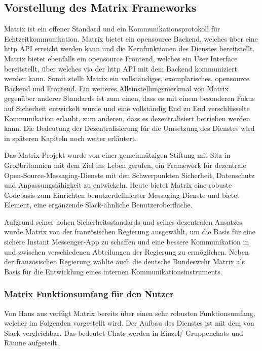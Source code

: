 \subsection{Vorstellung des Matrix Frameworks}\label{chapter:vdmf}
Matrix ist ein offener Standard und ein Kommunikationsprotokoll für  Echtzeitkommunikation. Matrix bietet ein opensource Backend, welches über eine http API erreicht werden kann und die Kernfunktionen des Dienstes bereitstellt. Matrix bietet ebenfalls ein opensource Frontend, welches ein User Interface bereitstellt, über welches via der http API mit dem Backend kommuniziert werden kann. Somit stellt Matrix ein vollständiges, exemplarisches, opensource Backend und Frontend. Ein weiteres Alleinstellungsmerkmal von Matrix gegenüber anderer Standards ist zum einen, dass es mit einem besonderen Fokus auf Sicherheit entwickelt wurde und eine vollständig End zu End verschlüsselte Kommunikation  erlaubt, zum anderen, dass es dezentralisiert betrieben werden kann. Die Bedeutung der Dezentralisierung für die Umsetzung des Dienstes wird in späteren Kapiteln noch weiter erläutert.

Das Matrix-Projekt wurde von einer gemeinnützigen Stiftung mit Sitz in Großbritannien mit dem Ziel ins Leben gerufen, ein Framework für dezentrale Open-Source-Messaging-Dienste mit den Schwerpunkten Sicherheit, Datenschutz und Anpassungsfähigkeit zu entwickeln. Heute bietet Matrix eine robuste Codebasis zum Einrichten benutzerdefinierter Messaging-Dienste und bietet Element, eine ergänzende Slack-ähnliche Benutzeroberfläche.

Aufgrund seiner hohen Sicherheitsstandards und seines dezentralen Ansatzes wurde Matrix  von der französischen Regierung ausgewählt, um die Basis für eine sichere Instant Messenger-App zu schaffen und eine bessere Kommunikation in und zwischen verschiedenen Abteilungen der Regierung zu ermöglichen. Neben der französischen Regierung wählte auch die deutsche Bundeswehr Matrix als Basis für die Entwicklung eines internen Kommunikationsinstruments.

\subsubsection{Matrix Funktionsumfang für den Nutzer}\label{chapter:aemn}
Von Haus aus verfügt Matrix bereits über einen sehr robusten Funktionsumfang, welcher im Folgenden vorgestellt wird.
Der Aufbau des Dienstes ist mit dem von Slack vergleichbar. Das bedeutet Chats werden in Einzel/ Gruppenchats und Räume aufgeteilt. 


